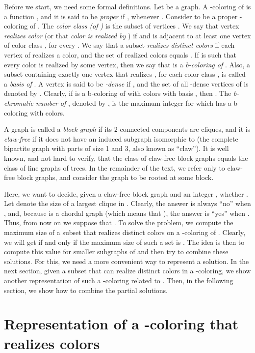 \documentclass{llncs}
\begin{document}
Before we start, we need some formal definitions. Let  be a graph. A -coloring of  is a function , and it is said to be \emph{proper} if , whenever . Consider  to be a proper -coloring of . The \emph{color class  (of )} is the subset of vertices . We say that vertex  \emph{realizes color } (or that \emph{color  is realized by }) if  and  is adjacent to at least one vertex of color class , for every . We say that a subset \emph{ realizes distinct colors} if each vertex of  realizes a color, and the set of realized colors equals . If  is such that every color is realized by some vertex, then we say that  is a \emph{b-coloring of }. Also, a subset containing exactly one vertex that realizes , for each color class , is called a \emph{basis of }. A vertex  is said to be \emph{-dense} if , and the set of all -dense vertices of  is denoted by . Clearly, if  is a b-coloring of  with  colors with basis , then . The \emph{b-chromatic number of }, denoted by , is the maximum integer  for which  has a b-coloring with  colors. 

A graph is called a \emph{block graph}  if its 2-connected components are cliques, and it is \emph{claw-free} if it does not have an induced subgraph isomorphic to  (the complete bipartite graph with parts of size 1 and 3, also known as ``claw''). It is well known, and not hard to verify, that the class of claw-free block graphs equals the class of line graphs of trees. In the remainder of the text, we refer only to claw-free block graphs, and consider the graph to be rooted at some block. 

Here, we want to decide, given a claw-free block graph  and an integer , whether . Let  denote the size of a largest clique in . Clearly, the answer is always ``no'' when , and, because  is a chordal graph (which means that ), the answer is ``yes'' when . Thus, from now on we suppose that . 
To solve the problem, we compute the maximum size of a subset  that realizes distinct colors on a -coloring of . Clearly, we will get  if and only if the maximum size of such a set is . The idea is then to compute this value for smaller subgraphs of  and then try to combine these solutions. For this, we need a more convenient way to represent a solution. In the next section, given a subset  that can realize distinct colors in a -coloring, we show another representation of such a -coloring related to . Then, in the following section, we show how to combine the partial solutions. 

\section{Representation of a -coloring that realizes  colors}
\end{document}
